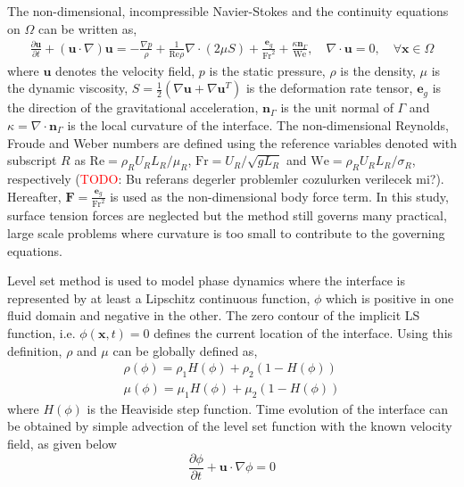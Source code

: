 \documentclass[11pt,a4paper,twoside]{article}
\begin{document}
	The  non-dimensional, incompressible Navier-Stokes and the continuity equations  on  $ \Omega $ can be written as,
	\begin{equation}
	\label{Eq.NonDimensionalNavierStokes}
	\begin{aligned}
	\frac{\partial \mathbf{u}}{\partial t} + \left(\mathbf{u}\cdot\nabla\right)\mathbf{u} = -\frac{\nabla p}{\rho}+ \frac{1}{ \text{Re}\rho} \nabla\cdot\left(2\mu S \right) +\frac{\mathbf{e}_g}{\text{Fr}^2} + \frac{\kappa \mathbf{n}_\Gamma}{\text{We}},  \quad  \nabla\cdot\mathbf{u} = 0,   \quad   \forall \mathbf{x} \in \Omega 
	\end{aligned}
	\end{equation}
	where $ \textbf{u} $ denotes the velocity field,  $ p $ is the static pressure, $ \rho$  is the density, $ \mu$ is the dynamic viscosity, $ S = \frac{1}{2}\left( \nabla \mathbf{u} + \nabla \mathbf{u}^T\right) $ is the deformation rate tensor, $ \mathbf{e}_g $ is the direction of the gravitational acceleration, $ \mathbf{n}_\Gamma $ is the unit normal of $ \Gamma $  and $ \kappa = \nabla\cdot\mathbf{n}_{\Gamma} $ is the local curvature of the interface. The non-dimensional Reynolds, Froude and Weber numbers  are defined using the reference variables denoted with subscript $ R $ as  $ \text{Re} = \rho_R U_R L_R / \mu_R $, $ \text{Fr} = U_R/ \sqrt{ gL_R}  $  and $ \text{We} =  \rho_R U_R L_R/ \sigma_R$, respectively (\textcolor{red}{TODO}: Bu referans degerler problemler cozulurken verilecek mi?). Hereafter, $ \mathbf{F} = \frac{\mathbf{e}_g}{\text{Fr}^2} $ is used as the non-dimensional body force term. In this study, surface tension forces are neglected but the method still governs many practical, large scale problems where curvature is too small to contribute to the governing equations.
		
	Level set method is used to model phase dynamics where the interface is represented by at least a Lipschitz continuous function, $ \phi  $ which is positive in one fluid domain and negative in the other. The zero contour of the implicit LS function, i.e. $ \phi(\textbf{x}, t) = 0 $ defines the current location of the interface. Using this definition, $ \rho $ and $ \mu $ can be globally defined as,  
	\begin{equation}
	\label{Eq.GlobalDensityViscosity}
	\begin{aligned}
	\rho(\phi) = \rho_1 H(\phi) + \rho_2\left( 1-H(\phi) \right) \\
	\mu(\phi) = \mu_1 H(\phi) + \mu_2\left( 1-H(\phi) \right)
	\end{aligned}
	\end{equation}
	where $ H(\phi) $ is the Heaviside step function. Time evolution of the interface can be obtained by simple advection of the level set function with the known velocity field, as given below
	\begin{equation}
	\label{Eq.LevelSet_1}
	\frac{\partial \phi}{\partial t}+\mathbf{u} \cdotp \nabla \phi =  0
	\end{equation}
	
\end{document}
